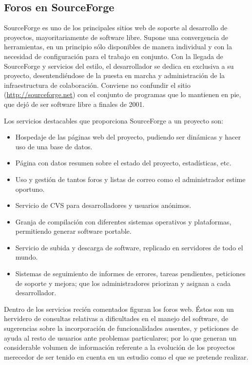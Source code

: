 \subsection{Foros en SourceForge} \label{intro_foros}
SourceForge es uno de los principales sitios web de soporte al desarrollo
de proyectos, mayoritariamente de software libre. Supone una convergencia de
herramientas, en un principio sólo disponibles de manera individual y con la
necesidad de configuración para el trabajo en conjunto. Con la llegada de
SourceForge y servicios del estilo, el desarrollador se dedica en exclusiva
a su proyecto, desentendiéndose de la puesta en marcha y administración de la
infraestructura de colaboración. Conviene no confundir el sitio
(\url{http://sourceforge.net}) con el conjunto de programas que lo mantienen
en pie, que dejó de ser software libre a finales de 2001.

Los servicios destacables que proporciona SourceForge a un proyecto son:
\begin{itemize}
\item Hospedaje de las páginas web del proyecto, pudiendo ser dinámicas y
hacer uso de una base de datos.
\item Página con datos resumen sobre el estado del proyecto, estadísticas, etc.
\item Uso y gestión de tantos foros y listas de correo como el administrador
estime oportuno.
\item Servicio de CVS para desarrolladores y usuarios anónimos.
\item Granja de compilación con diferentes sistemas operativos y plataformas,
permitiendo generar software portable.
\item Servicio de subida y descarga de software, replicado en servidores de
todo el mundo.
\item Sistemas de seguimiento de informes de errores, tareas pendientes,
peticiones de soporte y mejora; que los administradores priorizan y asignan
a cada desarrollador.
\end{itemize}

Dentro de los servicios recién comentados figuran los foros web. Éstos son
un hervidero de consultas relativas a dificultades en el manejo del
software, de sugerencias sobre la incorporación de funcionalidades ausentes,
y peticiones de ayuda al resto de usuarios ante problemas particulares;
por lo que generan un considerable volumen de información referente a la
evolución de los proyectos merecedor de ser tenido en cuenta en un estudio
como el que se pretende realizar.

